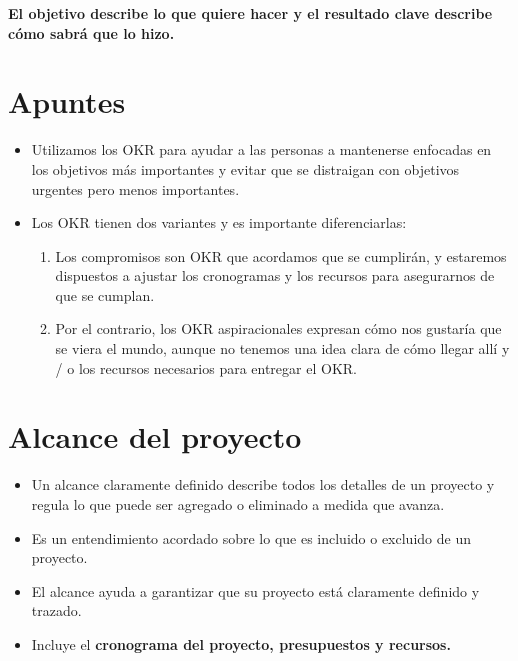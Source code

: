 \documentclass[10pt]{book}
\begin{document}
	    \textbf{El objetivo describe lo que quiere hacer y el resultado clave describe cómo sabrá que lo hizo.}
    
    \section{Apuntes}
    \begin{itemize}
	\item Utilizamos los OKR para ayudar a las personas a mantenerse enfocadas en los objetivos más importantes y evitar que se distraigan con objetivos urgentes pero menos importantes.
	\item Los OKR tienen dos variantes y es importante diferenciarlas:
	    \begin{enumerate}
		\item Los compromisos son OKR que acordamos que se cumplirán, y estaremos dispuestos a ajustar los cronogramas y los recursos para asegurarnos de que se cumplan.
		\item Por el contrario, los OKR aspiracionales expresan cómo nos gustaría que se viera el mundo, aunque no tenemos una idea clara de cómo llegar allí y / o los recursos necesarios para entregar el OKR.
	    \end{enumerate}
    \end{itemize}

\section{Alcance del proyecto}
\begin{itemize}
    \item Un alcance claramente definido describe todos los detalles de un proyecto y regula lo que puede ser agregado o eliminado a medida que avanza.
    \item Es un entendimiento acordado sobre lo que es incluido o excluido de un proyecto.
    \item El alcance ayuda a garantizar que su proyecto está claramente definido y trazado.
    \item Incluye el \textbf{cronograma del proyecto, presupuestos y recursos.}\\\\
\end{itemize}
\end{document}
